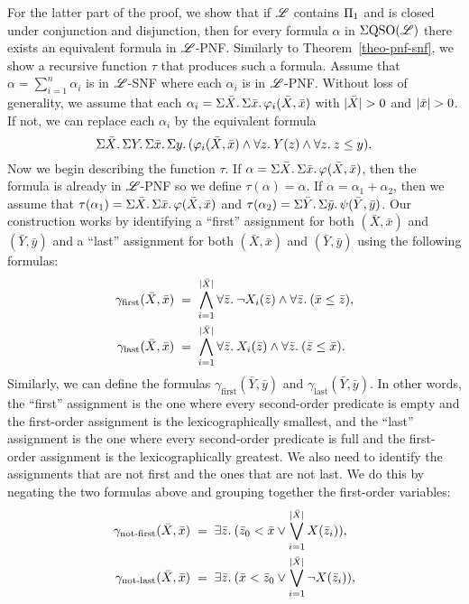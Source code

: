 For the latter part of the proof, we show that if $\mathscr{L}$ contains $\Pi_{1}$ and is closed under conjunction and disjunction, then for every formula $\alpha$ in $\Sigma{\rm QSO}(\mathscr{L})$ there exists an equivalent formula in $\mathscr{L}$-PNF. Similarly to Theorem~\ref{theo-pnf-snf}, we show a recursive function $\tau$ that produces such a formula. Assume that $\alpha = \sum_{i = 1}^n \alpha_i$ is in $\mathscr{L}$-SNF where each $\alpha_i$ is in $\mathscr{L}$-PNF. 
Without loss of generality, we assume that each $\alpha_i = \Sigma{\bar{X}}.\,\Sigma{\bar{x}}.\,\varphi_i(\bar{X},\bar{x})$ with $\vert \bar{X} \vert > 0$ and $\vert \bar{x} \vert > 0$. If not, we can replace each $\alpha_i$ by the equivalent formula
$$
\Sigma{\bar{X}}.\, \Sigma{Y}.\,\Sigma{\bar{x}}.\,\Sigma{y}.\,(\varphi_i(\bar{X},\bar{x})\wedge \forall{z}.\: Y(z) \wedge \forall{z}.\: z \leq y).
$$
Now we begin describing the function $\tau$. If $\alpha = \Sigma{\bar{X}}.\,\Sigma{\bar{x}}.\,\varphi(\bar{X},\bar{x})$, then the formula is already in $\mathscr{L}$-PNF so we define $\tau(\alpha) = \alpha$. If $\alpha = \alpha_1 + \alpha_2$, then we assume that $\tau(\alpha_1) = \Sigma{\bar{X}}.\,\Sigma{\bar{x}}.\,\varphi(\bar{X},\bar{x})$ and $\tau(\alpha_2) = \Sigma{\bar{Y}}.\,\Sigma{\bar{y}}.\,\psi(\bar{Y},\bar{y})$. Our construction works by identifying a ``first'' assignment for both $(\bar{X},\bar{x})$ and $(\bar{Y},\bar{y})$ and a ``last'' assignment for both $(\bar{X},\bar{x})$ and $(\bar{Y},\bar{y})$ using the following formulas:
\begin{align*}
\gamma_{\text{first}}(\bar{X},\bar{x}) & \; = \;  \bigwedge_{i = 1}^{\vert \bar{X} \vert} \forall{\bar{z}}.\:\neg X_i(\bar{z}) \wedge \forall{\bar{z}}.\:(\bar{x}\leq\bar{z}), \\
\gamma_{\text{last}}(\bar{X},\bar{x}) & \; = \;  \bigwedge_{i = 1}^{\vert \bar{X} \vert} \forall{\bar{z}}.\: X_i(\bar{z}) \wedge \forall{\bar{z}}.\:(\bar{z}\leq\bar{x}).
\end{align*}
Similarly, we can define the formulas $\gamma_{\text{first}}(\bar{Y},\bar{y})$ and $\gamma_{\text{last}}(\bar{Y},\bar{y})$.
In other words, the ``first'' assignment is the one where every second-order predicate is empty and the first-order assignment is the lexicographically smallest, and the ``last'' assignment is the one where every second-order predicate is full and the first-order assignment is the lexicographically greatest. We also need to identify the assignments that are not first and the ones that are not last. We do this by negating the two formulas above and grouping together the first-order variables:
\begin{align*}
\gamma_{\text{not-first}}(\bar{X},\bar{x}) & \; = \; \exists{\bar{z}}.\:(\bar{z}_0 < \bar{x} \vee \bigvee_{i = 1}^{\vert \bar{X} \vert}X(\bar{z}_i)), \\
\gamma_{\text{not-last}}(\bar{X},\bar{x}) & \; = \; \exists{\bar{z}}.\:(\bar{x} < \bar{z}_0 \vee \bigvee_{i = 1}^{\vert \bar{X} \vert}\neg X(\bar{z}_i)),
\end{align*}
